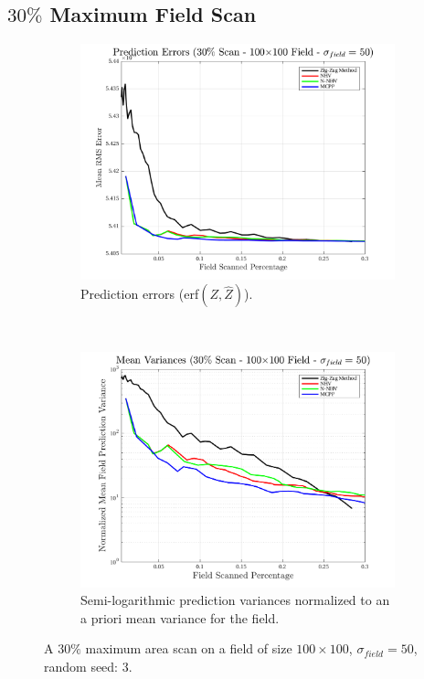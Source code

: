\FloatBarrier
\clearpage
\subsection{$30\%$ Maximum Field Scan}
\begin{figure}[htb!]
    \centering
    \begin{subfigure}[t]{0.65\textwidth}
        \centering
        \includegraphics[width=\linewidth]{figures/hbresults/pred_errs_30p_100x100_sf_50_seed_3.png}
        \captionsetup{skip=0.20\baselineskip,size=footnotesize}
        \caption{Prediction errors (erf$(Z,\hat{Z})$).}
        \label{fig:prederrs_sigma50_p30_s3}
    \end{subfigure}%
    \\
    \begin{subfigure}[t]{0.65\textwidth}
        \centering
        \includegraphics[width=\linewidth]{figures/hbresults/vars_30p_100x100_sf_50_seed_3.png}
        \captionsetup{skip=0.20\baselineskip,size=footnotesize}
        \caption{Semi-logarithmic prediction variances normalized to an a priori mean variance for the field.}
        \label{fig:prederrs_sigma50_p30_s3}
    \end{subfigure}
    \captionsetup{skip=0.20\baselineskip}
    \caption{A $30\%$ maximum area scan on a field of size $100 \times 100$, $\sigma_{field} = 50$, random seed: 3.}
    \label{fig:sigma50_p30_s3}
\end{figure}


